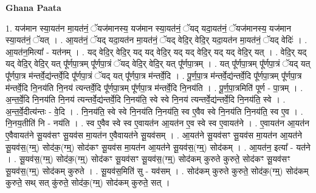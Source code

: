 \documentclass[17pt]{extarticle}
\begin{document}
\textbf{Ghana Paata } \newline

1. यज॑मान स्या॒यत॑न मा॒यत॑नं॒ ॅयज॑मानस्य॒ यज॑मान स्या॒यत॑नं॒ ॅयद् यदा॒यत॑नं॒ ॅयज॑मानस्य॒ यज॑मान स्या॒यत॑नं॒ ॅयत् । . आ॒यत॑नं॒ ॅयद् यदा॒यत॑न मा॒यत॑नं॒ ॅयद् वेदि॒र् वेदि॒र् यदा॒यत॑न मा॒यत॑नं॒ ॅयद् वेदिः॑ । . आ॒यत॑न॒मित्या᳚ - यत॑नम् । . यद् वेदि॒र् वेदि॒र् यद् यद् वेदि॒र् यद् यद् वेदि॒र् यद् यद् वेदि॒र् यत् । . वेदि॒र् यद् यद् वेदि॒र् वेदि॒र् यत् पू᳚र्णपा॒त्रम् पू᳚र्णपा॒त्रं ॅयद् वेदि॒र् वेदि॒र् यत् पू᳚र्णपा॒त्रम् । . यत् पू᳚र्णपा॒त्रम् पू᳚र्णपा॒त्रं ॅयद् यत् पू᳚र्णपा॒त्र म॑न्तर्वे॒द्य॑न्तर्वे॒दि पू᳚र्णपा॒त्रं ॅयद् यत् पू᳚र्णपा॒त्र म॑न्तर्वे॒दि । . पू॒र्ण॒पा॒त्र म॑न्तर्वे॒द्य॑न्तर्वे॒दि पू᳚र्णपा॒त्रम् पू᳚र्णपा॒त्र म॑न्तर्वे॒दि नि॒नय॑ति नि॒नय॑ त्यन्तर्वे॒दि पू᳚र्णपा॒त्रम् पू᳚र्णपा॒त्र म॑न्तर्वे॒दि नि॒नय॑ति । . पू॒र्ण॒पा॒त्रमिति॑ पूर्ण - पा॒त्रम् । . अ॒न्त॒र्वे॒दि नि॒नय॑ति नि॒नय॑ त्यन्तर्वे॒द्य॑न्तर्वे॒दि नि॒नय॑ति॒ स्वे स्वे नि॒नय॑ त्यन्तर्वे॒द्य॑न्तर्वे॒दि नि॒नय॑ति॒ स्वे । . अ॒न्त॒र्वे॒दीत्य॑न्तः - वे॒दि । . नि॒नय॑ति॒ स्वे स्वे नि॒नय॑ति नि॒नय॑ति॒ स्व ए॒वैव स्वे नि॒नय॑ति नि॒नय॑ति॒ स्व ए॒व । . नि॒नय॒तीति॑ नि - नय॑ति । . स्व ए॒वैव स्वे स्व ए॒वायत॑न आ॒यत॑न ए॒व स्वे स्व ए॒वायत॑ने । . ए॒वायत॑न आ॒यत॑न ए॒वैवायत॑ने सू॒यव॑सꣳ सू॒यव॑स मा॒यत॑न ए॒वैवायत॑ने सू॒यव॑सम् । . आ॒यत॑ने सू॒यव॑सꣳ सू॒यव॑स मा॒यत॑न आ॒यत॑ने सू॒यव॑स॒(ग्म्॒) सोद॑क॒(ग्म्॒) सोद॑कꣳ सू॒यव॑स मा॒यत॑न आ॒यत॑ने सू॒यव॑स॒(ग्म्॒) सोद॑कम् । . आ॒यत॑न॒ इत्या᳚ - यत॑ने । . सू॒यव॑स॒(ग्म्॒) सोद॑क॒(ग्म्॒) सोद॑कꣳ सू॒यव॑सꣳ सू॒यव॑स॒(ग्म्॒) सोद॑कम् कुरुते कुरुते॒ सोद॑कꣳ सू॒यव॑सꣳ सू॒यव॑स॒(ग्म्॒) सोद॑कम् कुरुते । . सू॒यव॑स॒मिति॑ सु - यव॑सम् । . सोद॑कम् कुरुते कुरुते॒ सोद॑क॒(ग्म्॒) सोद॑कम् कुरुते॒ सथ् सत् कु॑रुते॒ सोद॑क॒(ग्म्॒) सोद॑कम् कुरुते॒ सत् । \newline
\end{document}
